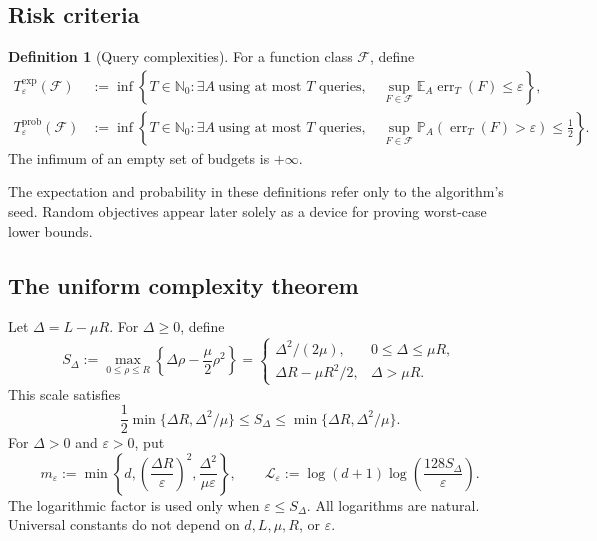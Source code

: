 \documentclass[11pt]{article}
\newcommand{\logfac}{\mathcal L_\eps}
\newcommand{\E}{\mathbb{E}}
\newcommand{\Pp}{\mathbb{P}}
\newcommand{\cF}{\mathcal{F}}
\newcommand{\eps}{\varepsilon}
\newcommand{\err}{\operatorname{err}}
\theoremstyle{plain}
\theoremstyle{definition}
\newtheorem{definition}[definition]{Definition}
\begin{document}
\subsection{Risk criteria}

\begin{definition}[Query complexities]\label{def:risks}
For a function class $\cF$, define
\begin{align}
 T^{\mathrm{exp}}_\eps(\cF)
 &:=\inf\left\{T\in\mathbb N_0:
     \exists A\ \text{using at most }T\text{ queries},\quad
     \sup_{F\in\cF}\E_A\err_T(F)\le\eps\right\},
       \label{eq:exp-risk}\\
 T^{\mathrm{prob}}_\eps(\cF)
 &:=\inf\left\{T\in\mathbb N_0:
     \exists A\ \text{using at most }T\text{ queries},\quad
     \sup_{F\in\cF}\Pp_A(\err_T(F)>\eps)\le\frac12\right\}.
       \label{eq:prob-risk}
\end{align}
The infimum of an empty set of budgets is $+\infty$.
\end{definition}

The expectation and probability in these definitions refer only to
the algorithm's seed. Random objectives appear later solely as a
device for proving worst-case lower bounds.

\subsection{The uniform complexity theorem}

Let $\Delta=L-\mu R$. For $\Delta\ge0$, define
\begin{equation}\label{eq:S-delta}
 S_\Delta:=\max_{0\le\rho\le R}
       \left\{\Delta\rho-\frac{\mu}{2}\rho^2\right\}
 =\begin{cases}
    \Delta^2/(2\mu),&0\le\Delta\le\mu R,\\[2pt]
    \Delta R-\mu R^2/2,&\Delta>\mu R.
   \end{cases}
\end{equation}
This scale satisfies
\begin{equation}\label{eq:S-comparison}
 \frac12\min\{\Delta R,\Delta^2/\mu\}
 \le S_\Delta\le\min\{\Delta R,\Delta^2/\mu\}.
\end{equation}
For $\Delta>0$ and $\eps>0$, put
\begin{equation}\label{eq:m-eps}
 m_\eps:=\min\left\{d,\left(\frac{\Delta R}{\eps}\right)^2,
                           \frac{\Delta^2}{\mu\eps}\right\},
 \qquad
 \logfac:=\log(d+1)\log\!\left(\frac{128S_\Delta}{\eps}\right).
\end{equation}
The logarithmic factor is used only when $\eps\le S_\Delta$.
All logarithms are natural. Universal constants do not depend on
$d,L,\mu,R$, or $\eps$.
\end{document}

